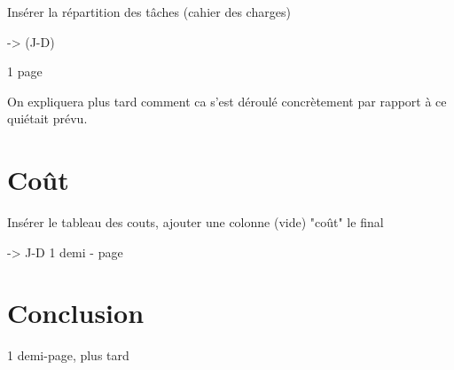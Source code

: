 		Insérer la répartition des tâches (cahier des charges)
		
		-> (J-D)
		
		1 page
		
		On expliquera plus tard comment ca s'est déroulé concrètement par rapport à ce quiétait prévu.
		
	\section{Coût}
		
		Insérer le tableau des couts, ajouter une colonne (vide) "coût" le final
		
		-> J-D
		1 demi - page
		
	\section*{Conclusion}
		
		1 demi-page, plus tard
		

